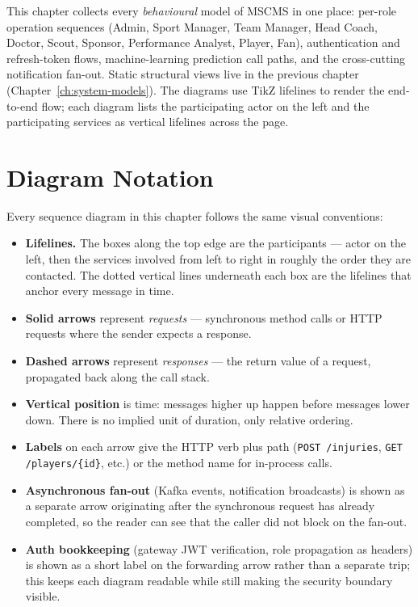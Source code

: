 \documentclass[12pt,a4paper,oneside]{report}
\begin{document}
This chapter collects every \emph{behavioural} model of MSCMS in one
place: per-role operation sequences (Admin, Sport Manager, Team
Manager, Head Coach, Doctor, Scout, Sponsor, Performance Analyst,
Player, Fan), authentication and refresh-token flows, machine-learning
prediction call paths, and the cross-cutting notification fan-out.
Static structural views live in the previous chapter
(Chapter~\ref{ch:system-models}). The diagrams use TikZ lifelines to
render the end-to-end flow; each diagram lists the participating actor
on the left and the participating services as vertical lifelines
across the page.

\section{Diagram Notation}
\label{sec:seq-notation}

Every sequence diagram in this chapter follows the same visual
conventions:

\begin{itemize}[leftmargin=*]
  \item \textbf{Lifelines.} The boxes along the top edge are the
        participants — actor on the left, then the services involved
        from left to right in roughly the order they are contacted.
        The dotted vertical lines underneath each box are the
        lifelines that anchor every message in time.
  \item \textbf{Solid arrows} represent \emph{requests} — synchronous
        method calls or HTTP requests where the sender expects a
        response.
  \item \textbf{Dashed arrows} represent \emph{responses} — the
        return value of a request, propagated back along the call
        stack.
  \item \textbf{Vertical position} is time: messages higher up
        happen before messages lower down. There is no implied unit
        of duration, only relative ordering.
  \item \textbf{Labels} on each arrow give the HTTP verb plus path
        (\texttt{POST /injuries}, \texttt{GET /players/\{id\}}, etc.)
        or the method name for in-process calls.
  \item \textbf{Asynchronous fan-out} (Kafka events, notification
        broadcasts) is shown as a separate arrow originating after
        the synchronous request has already completed, so the reader
        can see that the caller did not block on the fan-out.
  \item \textbf{Auth bookkeeping} (gateway JWT verification, role
        propagation as headers) is shown as a short label on the
        forwarding arrow rather than a separate trip; this keeps each
        diagram readable while still making the security boundary
        visible.
\end{itemize}
\end{document}
